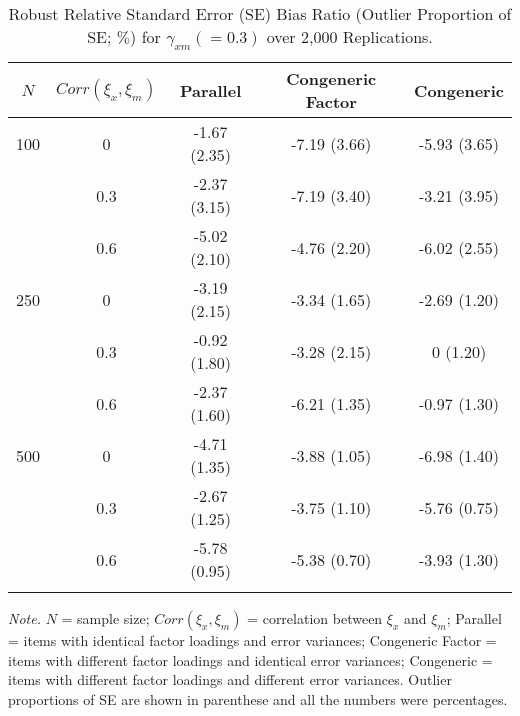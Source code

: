 \documentclass[
  man, donotrepeattitle]{apa6}
\begin{document}
\begin{table}[tbp]

\begin{center}
\begin{threeparttable}

\caption{\label{tab:MAD relative SE bias with outliers proportion}Robust Relative Standard Error (SE) Bias Ratio (Outlier Proportion of SE; $\%$) for $\gamma_{xm} (= 0.3)$ over 2,000 Replications.}

\begin{tabular}{ccccc}
\toprule
$\textit{N}$ & \multicolumn{1}{c}{$Corr(\xi_{x}, \xi_{m})$} & \multicolumn{1}{c}{Parallel} & \multicolumn{1}{c}{Congeneric Factor} & \multicolumn{1}{c}{Congeneric}\\
\midrule
100 & 0 & -1.67 (2.35) & -7.19 (3.66) & -5.93 (3.65)\\
 & 0.3 & -2.37 (3.15) & -7.19 (3.40) & -3.21 (3.95)\\
 & 0.6 & -5.02 (2.10) & -4.76 (2.20) & -6.02 (2.55)\\
250 & 0 & -3.19 (2.15) & -3.34 (1.65) & -2.69 (1.20)\\
 & 0.3 & -0.92 (1.80) & -3.28 (2.15) & 0 (1.20)\\
 & 0.6 & -2.37 (1.60) & -6.21 (1.35) & -0.97 (1.30)\\
500 & 0 & -4.71 (1.35) & -3.88 (1.05) & -6.98 (1.40)\\
 & 0.3 & -2.67 (1.25) & -3.75 (1.10) & -5.76 (0.75)\\
 & 0.6 & -5.78 (0.95) & -5.38 (0.70) & -3.93 (1.30)\\
\bottomrule
\addlinespace
\end{tabular}

\begin{tablenotes}[para]
\normalsize{\textit{Note.} $\textit{N}$ = sample size; $Corr(\xi_{x}, \xi_{m})$ = correlation between $\xi_{x}$ and $\xi_{m}$; Parallel = items with identical factor loadings and error variances; Congeneric Factor = items with different factor loadings and identical error variances; Congeneric = items with different factor loadings and different error variances. Outlier proportions of SE are shown in parenthese and all the numbers were percentages.}
\end{tablenotes}

\end{threeparttable}
\end{center}

\end{table}
\end{document}
